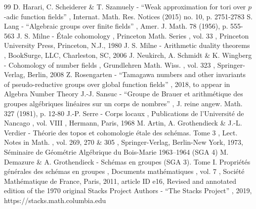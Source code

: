 \documentclass[11pt]{article}
\begin{document}
\begin{thebibliography}{99}
 D. Harari, C. Scheiderer \& T. Szamuely - “Weak approximation for tori over $p$-adic function fields” , Internat. Math. Res. Notices (2015) no. 10, p. 2751-2783
 S. Lang - “Algebraic groups over finite fields” , Amer. J. Math. 78 (1956), p. 555-563
 J. S. Milne - Étale cohomology , Princeton Math. Series , vol. 33 , Princeton University Press, Princeton, N.J., 1980
 J. S. Milne - Arithmetic duality theorems , BookSurge, LLC, Charleston, SC, 2006
 J. Neukirch, A. Schmidt \& K. Wingberg - Cohomology of number fields , Grundlehren Math. Wiss. , vol. 323 , Springer-Verlag, Berlin, 2008
 Z. Rosengarten - “Tamagawa numbers and other invariants of pseudo-reductive groups over global function fields” , 2018, to appear in Algebra Number Theory
 J.-J. Sansuc - “Groupe de Brauer et arithmétique des groupes algébriques linéaires sur un corps de nombres” , J. reine angew. Math. 327 (1981), p. 12-80
 J.-P. Serre - Corps locaux , Publications de l’Université de Nancago , vol. VIII , Hermann, Paris, 1968
 M. Artin, A. Grothendieck \& J.-L. Verdier - Théorie des topos et cohomologie étale des schémas. Tome 3 , Lect. Notes in Math. , vol. 269, 270 \& 305 , Springer-Verlag, Berlin-New York, 1973, Séminaire de Géométrie Algébrique du Bois-Marie 1963–1964 (SGA 4)
 M. Demazure \& A. Grothendieck - Schémas en groupes (SGA 3). Tome I. Propriétés générales des schémas en groupes , Documents mathématiques , vol. 7 , Société Mathématique de France, Paris, 2011, article ID e16, Revised and annotated edition of the 1970 original
 Stacks Project Authors - “The Stacks Project” , 2019, https://stacks.math.columbia.edu
\end{thebibliography}
\end{document}
